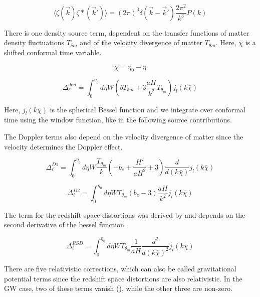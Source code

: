 \begin{equation}
    \langle \zeta(\vec{k})\zeta*(\vec{k}')\rangle = (2\pi)^3 \delta(\vec{k}-\vec{k}')\frac{2\pi^2}{k^3}P(k)
\end{equation}

There is one density source term, dependent on the transfer functions of matter density fluctuations $T_{\delta m}$ and of the velocity divergence of matter $T_{\theta m}$. Here, $\bar{\chi}$ is a shifted conformal time variable.

\begin{equation}
    \bar{\chi} = \eta_0 - \eta 
\end{equation}


\begin{equation}
    \Delta_\ell^{den}=\int_0^{\eta_0} d\eta W \left(b T_{\delta m} +3 \frac{aH}{k^2} T_{\theta_m}\right)j_l(k \bar{\chi})
\end{equation}

Here, $j_l(k \bar{\chi})$ is the spherical Bessel function and we integrate over conformal time using the window function, like in the following source contributions.

The Doppler terms also depend on the velocity divergence of matter since the velocity determines the Doppler effect.

\begin{equation}
    \Delta_\ell^{D1}=\int_0^{\eta_0} d\eta W \frac{T_{\theta_m}}{k} \left(-b_e + \frac{H'}{aH^2}+3\right)\frac{d}{d(k\bar{\chi})} j_l(k \bar{\chi})
\end{equation}

\begin{equation}
    \Delta_\ell^{D2}=\int_0^{\eta_0} d\eta W T_{\theta_m}(b_e-3) \frac{aH}{k^2} j_l(k \bar{\chi})
\end{equation}

The term for the redshift space distortions was derived by \cite{kaiser_clustering_1987} and depends on the second derivative of the bessel function.

\begin{equation}
    \Delta_\ell^{RSD}=\int_0^{\eta_0} d\eta W T_{\theta_m} \frac{1}{aH}\frac{d^2}{d(k\bar{\chi})^2} j_l(k \bar{\chi})
\end{equation}

There are five relativistic corrections, which can also be called gravitational potential terms since the redshift space distortions are also relativistic. In the GW case, two of these terms vanish (\cite{dallarmi_dipole_2022}), while the other three are non-zero.

